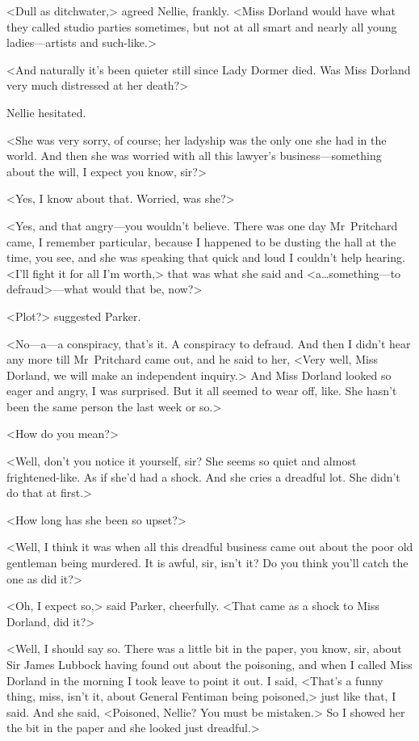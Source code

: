 <Dull as ditchwater,> agreed Nellie, frankly. <Miss Dorland would have what they called studio parties sometimes, but not at all smart and nearly all young ladies—artists and such-like.>

<And naturally it's been quieter still since Lady Dormer died. Was Miss Dorland very much distressed at her death?>

Nellie hesitated.

<She was very sorry, of course; her ladyship was the only one she had in the world. And then she was worried with all this lawyer's business—something about the will, I expect you know, sir?>

<Yes, I know about that. Worried, was she?>

<Yes, and that angry—you wouldn't believe. There was one day Mr~Pritchard came, I remember particular, because I happened to be dusting the hall at the time, you see, and she was speaking that quick and loud I couldn't help hearing. <I'll fight it for all I'm worth,> that was what she said and <a\dots  something—to defraud>—what would that be, now?>

<Plot?> suggested Parker.

<No—a—a conspiracy, that's it. A conspiracy to defraud. And then I didn't hear any more till Mr~Pritchard came out, and he said to her, <Very well, Miss Dorland, we will make an independent inquiry.> And Miss Dorland looked so eager and angry, I was surprised. But it all seemed to wear off, like. She hasn't been the same person the last week or so.>

<How do you mean?>

<Well, don't you notice it yourself, sir? She seems so quiet and almost frightened-like. As if she'd had a shock. And she cries a dreadful lot. She didn't do that at first.>

<How long has she been so upset?>

<Well, I think it was when all this dreadful business came out about the poor old gentleman being murdered. It is awful, sir, isn't it? Do you think you'll catch the one as did it?>

<Oh, I expect so,> said Parker, cheerfully. <That came as a shock to Miss Dorland, did it?>

<Well, I should say so. There was a little bit in the paper, you know, sir, about Sir James Lubbock having found out about the poisoning, and when I called Miss Dorland in the morning I took leave to point it out. I said, <That's a funny thing, miss, isn't it, about General Fentiman being poisoned,> just like that, I said. And she said, <Poisoned, Nellie? You must be mistaken.> So I showed her the bit in the paper and she looked just dreadful.>

